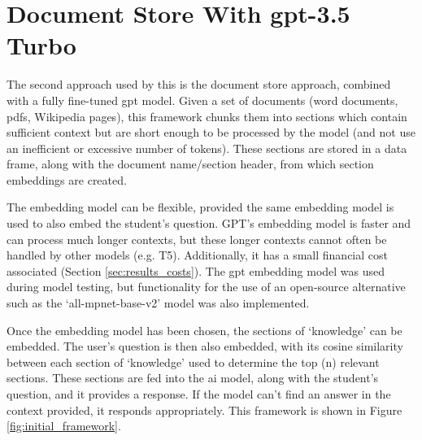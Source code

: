 


\section{Document Store With \acrshort{gpt}-3.5 Turbo}\label{methodology_gpt}
The second approach used by this \papertype is the document store approach, combined with a fully fine-tuned \acrshort{gpt} model. Given a set of documents (word documents, \acrshort{pdf}s, Wikipedia pages), this framework chunks them into sections which contain sufficient context but are short enough to be processed by the model (and not use an inefficient or excessive number of tokens). These sections are stored in a data frame, along with the document name/section header, from which section embeddings are created.

The embedding model can be flexible, provided the same embedding model is used to also embed the student's question. GPT's embedding model is faster and can process much longer contexts, but these longer contexts cannot often be handled by other models (e.g. T5). Additionally, it has a small financial cost associated (Section \ref{sec:results_costs}). The \acrshort{gpt} embedding model was used during model testing, but functionality for the use of an open-source alternative such as the `all-mpnet-base-v2' model \citep{huggingface_tokeniser_model} was also implemented.

Once the embedding model has been chosen, the sections of `knowledge' can be embedded. The user's question is then also embedded, with its cosine similarity between each section of `knowledge' used to determine the top (n) relevant sections. These sections are fed into the \acrshort{ai} model, along with the student's question, and it provides a response. If the model can't find an answer in the context provided, it responds appropriately. This framework is shown in Figure \ref{fig:initial_framework}.

